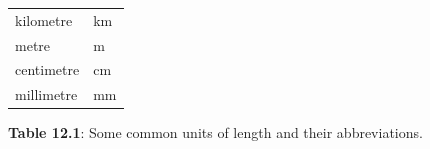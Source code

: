 {\begin{center}
\begin{xtabular}[t]{|l|l|}
        kilometre &
    
    
        km%
     \tabularnewline{}
    
    
        metre &
    
    
        m%
     \tabularnewline{}
    
    
        centimetre &
    
    
        cm%
     \tabularnewline{}
    
    
        millimetre &
    
    
        mm%
     \tabularnewline{}
    \end{xtabular}
      \end{center}
    \begin{center}{\small\bfseries Table 12.1}: Some common units of length and their abbreviations.\end{center}
    
    \addtocounter{footnote}{-0}
    
          } %
